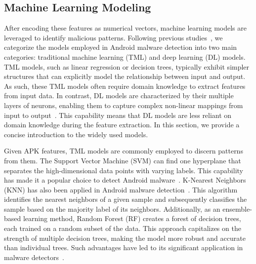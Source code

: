 \subsection{Machine Learning Modeling}
\label{sub:ml_models}
After encoding these features as numerical vectors, machine learning models are leveraged to identify malicious patterns.
Following previous studies~\cite{qiu2020survey,zhao2021impact}, we categorize the models employed in Android malware detection into two main categories: traditional machine learning (TML) and deep learning (DL) models.
TML models, such as linear regression or decision trees, typically exhibit simpler structures that can explicitly model the relationship between input and output. 
As such, these TML models often require domain knowledge to extract features from input data.
In contrast, DL models are characterized by their multiple layers of neurons, enabling them to capture complex non-linear mappings from input to output~\cite{zhao2018deepsim}.
This capability means that DL models are less reliant on domain knowledge during the feature extraction.
In this section, we provide a concise introduction to the widely used models.

Given APK features, TML models are commonly employed to discern patterns from them.
The Support Vector Machine (SVM) can find one hyperplane that separates the high-dimensional data points with varying labels.
This capability has made it a popular choice to detect Android malware~\cite{arp2014drebin,hou2017hindroid,xu2020sdac,sun2016sigpid,garcia2018lightweight}.
K-Nearest Neighbors (KNN) has also been applied in Android malware detection~\cite{wu2019malscan,wu2021homdroid,aafer2013droidapiminer,wu2016effective}.
This algorithm identifies the nearest neighbors of a given sample and subsequently classifies the sample based on the majority label of its neighbors.
Additionally, as an ensemble-based learning method, Random Forest (RF) creates a forest of decision trees, each trained on a random subset of the data.
This approach capitalizes on the strength of multiple decision trees, making the model more robust and accurate than individual trees.
Such advantages have led to its significant application in malware detectors~\cite{mariconti2016mamadroid,zhu2018hemd}.

